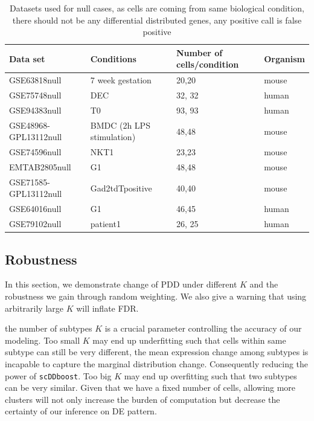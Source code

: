 \documentclass[aoas,preprint]{imsart}
\begin{document}
\begin{table}[h!]
\footnotesize
\centering
\begin{tabular}{ |p{3cm}|p{5cm}|p{3cm}|p{2cm}|}
\hline
 Data set & Conditions & Number of cells/condition & Organism \\
\hline
\hline
GSE63818null & 7 week gestation  & 20,20 &mouse \\
\hline
GSE75748null & DEC & 32, 32 & human\\
\hline
GSE94383null & T0 & 93, 93 & human \\
\hline
GSE48968-GPL13112null & BMDC (2h LPS stimulation) & 48,48 & mouse \\
 \hline
 GSE74596null & NKT1 & 23,23 & mouse\\
 \hline
 EMTAB2805null & G1 & 48,48 & mouse\\
 \hline
GSE71585-GPL13112null &Gad2tdTpositive  & 40,40 & mouse \\
\hline
GSE64016null & G1 & 46,45 & human \\
\hline
GSE79102null & patient1 & 26, 25 & human\\
\hline
\end{tabular}
\caption{Datasets used for null cases, as cells are coming from same biological condition, there should not be any differential distributed genes, any positive call is false positive}
\label{table:2}
\end{table}

\clearpage

\subsection{Robustness}

In this section, we demonstrate change of PDD under different $K$ and the robustness we gain through random weighting. We also give a warning that using arbitrarily large $K$ will inflate FDR. 

the number of subtypes $K$ is a crucial parameter controlling the accuracy of our modeling. 
Too small $K$ may end up underfitting such that cells within same subtype can still be very different, 
the mean expression change among subtypes is incapable to capture the marginal distribution change.
Consequently reducing the power of \texttt{scDDboost}.
Too big $K$ may end up overfitting such that two subtypes can be very similar. Given that we have a fixed number of cells, allowing more clusters will not only increase the burden of computation 
but decrease the certainty of our inference on DE pattern. \\
\end{document}
